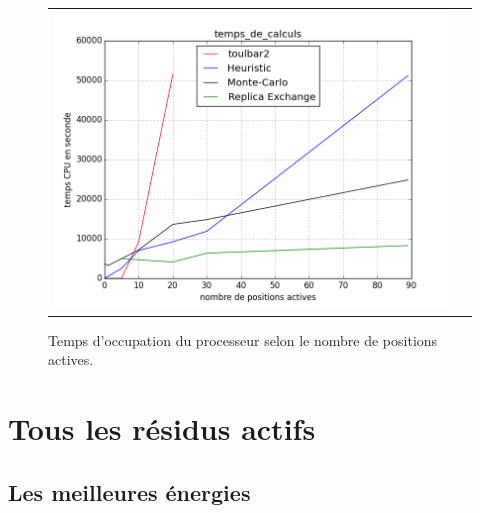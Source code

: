 \documentclass[a4paper,12pt]{article}
\begin{document}
    \begin{figure}[h]
      \centering
      \begin{tabular}{cc}
        \includegraphics[width=12cm]{image/temps_de_calculs.png} &
      \end{tabular}
      
      \caption{Temps d'occupation du processeur selon le nombre de positions actives.}
      \label{temps_CPU}
    \end{figure}
    
    
    \clearpage
   \section{Tous les résidus actifs} 


   \subsection{Les meilleures énergies} 
\end{document}

